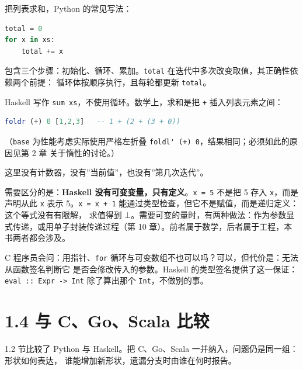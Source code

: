 把列表求和，Python 的常见写法：

\begin{lstlisting}[language=Python]
total = 0
for x in xs:
    total += x
\end{lstlisting}

包含三个步骤：初始化、循环、累加。\passthrough{\lstinline!total!} 在迭代中多次改变取值，其正确性依赖两个前提：
循环体按顺序执行，且每轮都更新 \passthrough{\lstinline!total!}。

Haskell 写作 \passthrough{\lstinline!sum xs!}，不使用循环。数学上，求和是把 \passthrough{\lstinline!+!} 插入列表元素之间：

\begin{lstlisting}[language=Haskell]
foldr (+) 0 [1,2,3]   -- 1 + (2 + (3 + 0))
\end{lstlisting}

（\passthrough{\lstinline!base!} 为性能考虑实际使用严格左折叠 \passthrough{\lstinline!foldl' (+) 0!}，结果相同；必须如此的原因见第 2 章
关于惰性的讨论。）

这里没有计数器，没有''当前值''，也没有''第几次迭代''。

需要区分的是：\textbf{Haskell 没有可变变量，只有定义}。\passthrough{\lstinline!x = 5!} 不是把 5 存入 \passthrough{\lstinline!x!}，而是声明从此
\passthrough{\lstinline!x!} 表示 5。\passthrough{\lstinline!x = x + 1!} 能通过类型检查，但它不是赋值，而是递归定义：这个等式没有有限解，
求值得到 \(\bot\)。需要可变的量时，有两种做法：作为参数显式传递，或用单子封装传递过程（第 10
章）。前者属于数学，后者属于工程，本书两者都会涉及。

C 程序员会问：用指针、\passthrough{\lstinline!for!} 循环与可变数组不也可以吗？可以，但代价是：无法从函数签名判断它
是否会修改传入的参数。Haskell 的类型签名提供了这一保证：\passthrough{\lstinline!eval :: Expr -> Int!} 除了算出那个
\passthrough{\lstinline!Int!}，不做别的事。

\section{1.4 与 C、Go、Scala 比较}\label{ux4e0e-cgoscala-ux6bd4ux8f83}

1.2 节比较了 Python 与 Haskell。把 C、Go、Scala 一并纳入，问题仍是同一组：形状如何表达，
谁能增加新形状，遗漏分支时由谁在何时报告。

